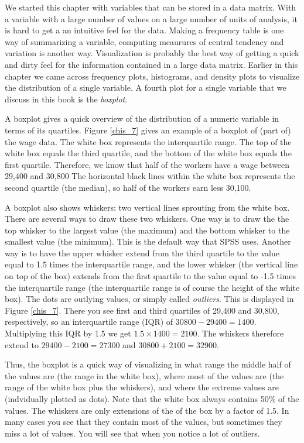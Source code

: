 \documentclass[]{report}\usepackage[]{graphicx}\usepackage[]{color}
\begin{document}
We started this chapter with variables that can be stored in a data matrix. With a variable with a large number of values on a large number of units of analysis, it is hard to get a an intuitive feel for the data. Making a frequency table is one way of summarizing a variable, computing meaurures of central tendency and variation is another way. Visualization is probably the best way of getting a quick and dirty feel for the information contained in a large data matrix. Earlier in this chapter we came across frequency plots, histograms, and density plots to visualize the distribution of a single variable. A fourth plot for a single variable that we discuss in this book is the \textit{boxplot}.  

A boxplot gives a quick overview of the distribution of a numeric variable in terms of its quartiles. Figure \ref {chis_7} gives an example of a boxplot of (part of) the wage data. The white box represents the interquartile range. The top of the white box equals the third quartile, and the bottom of the white box equals the first quartile. Therefore, we know that half of the workers have a wage between 29,400 and 30,800 The horizontal black lines within the white box represents the second quartile (the median), so half of the workers earn less 30,100. 

A boxplot also shows whiskers: two vertical lines sprouting from the white box. There are several ways to draw these two whiskers. One way is to draw the the top whisker to the largest value (the maximum) and the bottom whisker to the smallest value (the minimum). This is the default way that SPSS uses. Another way is to have the upper whisker extend from the third quartile to the value equal to 1.5 times the interquartile range, and the lower whisker (the vertical line on top of the box) extends from the first quartile to the value equal to -1.5 times the interquartile range (the interquartile range is of course the height of the white box). The dots are outlying values, or simply called \textit{outliers}. This is displayed in Figure \ref{chis_7}. There you see first and third quartiles of 29,400 and 30,800, respectively, so an interquartile range (IQR) of $30800-29400=1400$. Multiplying this IQR by 1.5 we get $1.5 \times 1400= 2100$. The whiskers therefore extend to $29400-2100=27300$ and $30800+2100=32900$. 

Thus, the boxplot is a quick way of visualizing in what range the middle half of the values are (the range in the white box), where most of the values are (the range of the white box plus the whiskers), and where the extreme values are (indvidually plotted as dots). Note that the white box always contains 50\% of the values. The whiskers are only extensions of the of the box by a factor of 1.5. In many cases you see that they contain most of the values, but sometimes they miss a lot of values. You will see that when you notice a lot of outliers.
\end{document}
